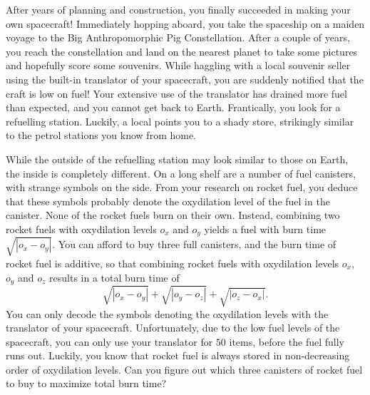 






After years of planning and construction, you finally succeeded in making your own spacecraft! Immediately hopping aboard, you take the spaceship on a maiden voyage to the Big Anthropomorphic Pig Constellation. After a couple of years, you reach the constellation and land on the nearest planet to take some pictures and hopefully score some souvenirs. While haggling with a local souvenir seller using the built-in translator of your spacecraft, you are suddenly notified that the craft is low on fuel! Your extensive use of the translator has drained more fuel than expected, and you cannot get back to Earth. Frantically, you look for a refuelling station. Luckily, a local points you to a shady store, strikingly similar to the petrol stations you know from home.

While the outside of the refuelling station may look similar to those on Earth, the inside is completely different. On a long shelf are a number of fuel canisters, with strange symbols on the side. From your research on rocket fuel, you deduce that these symbols probably denote the oxydilation level of the fuel in the canister. None of the rocket fuels burn on their own. Instead, combining two rocket fuels with oxydilation levels $o_x$ and $o_y$ yields a fuel with burn time $\sqrt{|o_x-o_y|}$. You can afford to buy three full canisters, and the burn time of rocket fuel is additive, so that combining rocket fuels with oxydilation levels $o_x$, $o_y$ and $o_z$ results in a total burn time of
\[\sqrt{|o_x-o_y|} + \sqrt{|o_y-o_z|} + \sqrt{|o_z-o_x|}.\]
You can only decode the symbols denoting the oxydilation levels with the translator of your spacecraft. Unfortunately, due to the low fuel levels of the spacecraft, you can only use your translator for $50$ items, before the fuel fully runs out. Luckily, you know that rocket fuel is always stored in non-decreasing order of oxydilation levels. Can you figure out which three canisters of rocket fuel to buy to maximize total burn time?



